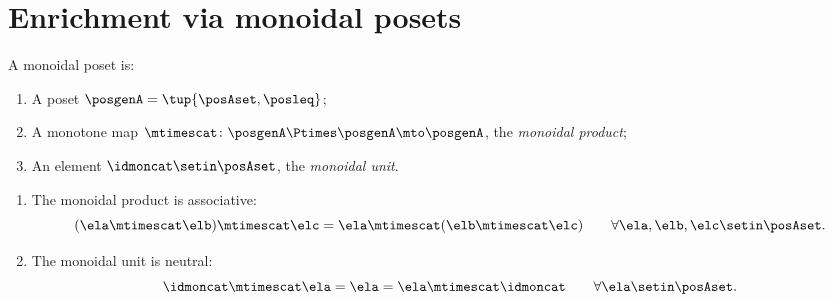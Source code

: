 
\section{Enrichment via monoidal posets}
\label{sec:quantale-enrichment}


\begin{ctdefinition}
    \label{def:monoidal-poset-again}
    A monoidal poset is:

    \constit
    \begin{enumerate}
        \item A poset $\posgenA = \tup{\posAset, \posleq}$;
        \item A monotone map $\mtimescat \colon \posgenA \Ptimes \posgenA \mto \posgenA$, the \emph{monoidal product};
        \item An element $\idmoncat \setin \posAset$, the \emph{monoidal unit}.
    \end{enumerate}

    \condit
    \begin{enumerate}
        \item The monoidal product is associative:
              \begin{equation}
                  (\ela \mtimescat \elb) \mtimescat \elc = \ela \mtimescat (\elb \mtimescat \elc) \qquad \forall \ela, \elb, \elc \setin \posAset.
              \end{equation}
        \item The monoidal unit is neutral:
              \begin{equation}
                  \idmoncat \mtimescat \ela = \ela = \ela \mtimescat \idmoncat \qquad \forall \ela \setin \posAset.
              \end{equation}

    \end{enumerate}

\end{ctdefinition}

